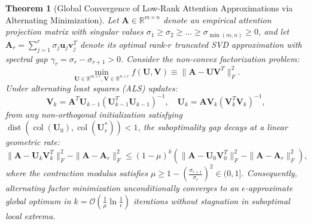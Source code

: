 \documentclass[journal]{IEEEtran}
\newtheorem{theorem}{Theorem}
\begin{document}
\begin{theorem}[Global Convergence of Low-Rank Attention Approximations via Alternating Minimization]
\label{thm:als_global_convergence}
Let $\mathbf{A} \in \mathbb{R}^{m \times n}$ denote an empirical attention projection matrix with singular values $\sigma_1 \ge \sigma_2 \ge \dots \ge \sigma_{\min(m, n)} \ge 0$, and let $\mathbf{A}_r = \sum_{j=1}^r \sigma_j \mathbf{u}_j \mathbf{v}_j^T$ denote its optimal rank-$r$ truncated SVD approximation with spectral gap $\gamma_r = \sigma_r - \sigma_{r+1} > 0$.
Consider the non-convex factorization problem:
\begin{equation}
\min_{\mathbf{U} \in \mathbb{R}^{m \times r}, \mathbf{V} \in \mathbb{R}^{n \times r}} f(\mathbf{U}, \mathbf{V}) \equiv \|\mathbf{A} - \mathbf{U} \mathbf{V}^T\|_F^2.
\end{equation}
Under alternating least squares (ALS) updates:
\begin{equation}
\mathbf{V}_{k} = \mathbf{A}^T \mathbf{U}_{k-1} (\mathbf{U}_{k-1}^T \mathbf{U}_{k-1})^{-1}, \quad \mathbf{U}_k = \mathbf{A} \mathbf{V}_k (\mathbf{V}_k^T \mathbf{V}_k)^{-1},
\end{equation}
from any non-orthogonal initialization satisfying $\operatorname{dist}(\operatorname{col}(\mathbf{U}_0), \operatorname{col}(\mathbf{U}_r^*)) < 1$, the suboptimality gap decays at a linear geometric rate:
\begin{equation}
\|\mathbf{A} - \mathbf{U}_k \mathbf{V}_k^T\|_F^2 - \|\mathbf{A} - \mathbf{A}_r\|_F^2 \le (1 - \mu)^k \left( \|\mathbf{A} - \mathbf{U}_0 \mathbf{V}_0^T\|_F^2 - \|\mathbf{A} - \mathbf{A}_r\|_F^2 \right),
\end{equation}
where the contraction modulus satisfies $\mu \ge 1 - \left(\frac{\sigma_{r+1}}{\sigma_r}\right)^2 \in (0, 1]$.
Consequently, alternating factor minimization unconditionally converges to an $\epsilon$-approximate global optimum in $k = \mathcal{O}\left( \frac{1}{\mu} \ln \frac{1}{\epsilon} \right)$ iterations without stagnation in suboptimal local extrema.
\end{theorem}
\end{document}
